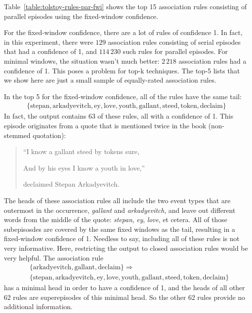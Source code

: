 
Table~\ref{table:tolstoy-rules-par-fwi} shows the top 15 association rules consisting of parallel episodes using the fixed-window confidence.

For the fixed-window confidence, there are a lot of rules of confidence 1. In fact, in this experiment, there were $ 129 $ association rules consisting of serial episodes that had a confidence of 1, and $ 114\,230 $ such rules for parallel episodes. For minimal windows, the situation wasn't much better: $ 2\,218 $ association rules had a confidence of 1. This poses a problem for top-k techniques. The top-5 lists that we show here are just a small sample of equally-rated association rules.

In the top 5 for the fixed-window confidence, all of the rules have the same tail:
\begin{align*}
\{ \text{stepan},\allowbreak\text{arkadyevitch},\allowbreak\text{ey},\allowbreak\text{love},\allowbreak\text{youth},\allowbreak\text{gallant},\allowbreak\text{steed},\allowbreak\text{token},\allowbreak\text{declaim} \}
\end{align*}
In fact, the output contains 63 of these rules, all with a confidence of 1. This episode originates from a quote that is mentioned twice in the book (non-stemmed quotation):
\begin{quotation}
``I know a gallant steed by tokens sure,

And by his eyes I know a youth in love,''

declaimed Stepan Arkadyevitch.
\end{quotation}
The heads of these association rules all include the two event types that are outermost in the occurrence, \emph{gallant} and \emph{arkadyevitch}, and leave out different words from the middle of the quote: \emph{stepan}, \emph{ey}, \emph{love}, et cetera. All of those subepisosdes are covered by the same fixed windows as the tail, resulting in a fixed-window confidence of 1. Needless to say, including all of these rules is not very informative. Here, restricting the output to closed association rules would be very helpful. The association rule
\begin{align*}
& \{ \text{arkadyevitch},\allowbreak\text{gallant},\allowbreak\text{declaim} \} \Rightarrow \\
& \{ \text{stepan},\allowbreak\text{arkadyevitch},\allowbreak\text{ey},\allowbreak\text{love},\allowbreak\text{youth},\allowbreak\text{gallant},\allowbreak\text{steed},\allowbreak\text{token},\allowbreak\text{declaim} \}
\end{align*}
has a minimal head in order to have a confidence of 1, and the heads of all other 62 rules are superepisodes of this minimal head. So the other 62 rules provide no additional information.

